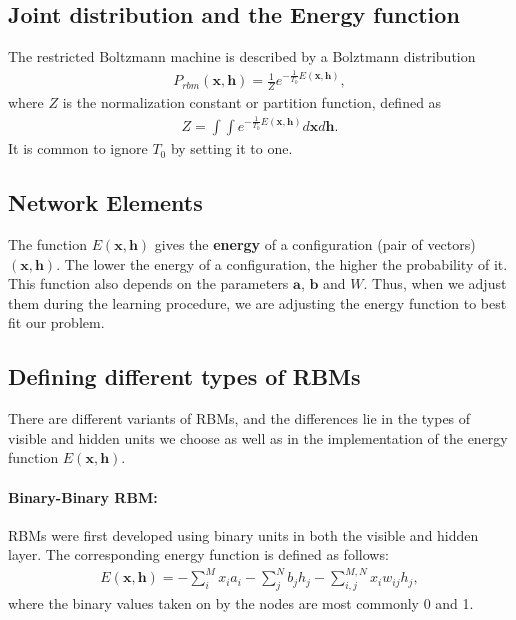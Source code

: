 \documentclass[%
oneside,                 %
final,                   %
10pt]{article}
\begin{document}
\subsection{Joint distribution and the Energy function}
The restricted Boltzmann machine is described by a Bolztmann distribution
\begin{align}
	P_{rbm}(\mathbf{x},\mathbf{h}) = \frac{1}{Z} e^{-\frac{1}{T_0}E(\mathbf{x},\mathbf{h})},
\end{align}
where $Z$ is the normalization constant or partition function, defined as 
\begin{align}
	Z = \int \int e^{-\frac{1}{T_0}E(\mathbf{x},\mathbf{h})} d\mathbf{x} d\mathbf{h}.
\end{align}
It is common to ignore $T_0$ by setting it to one. 

\subsection{Network Elements}

The function $E(\mathbf{x},\mathbf{h})$ gives the \textbf{energy} of a
configuration (pair of vectors) $(\mathbf{x}, \mathbf{h})$. The lower
the energy of a configuration, the higher the probability of it. This
function also depends on the parameters $\mathbf{a}$, $\mathbf{b}$ and
$W$. Thus, when we adjust them during the learning procedure, we are
adjusting the energy function to best fit our problem.

\subsection{Defining different types of RBMs}
There are different variants of RBMs, and the differences lie in the types of visible and hidden units we choose as well as in the implementation of the energy function $E(\mathbf{x},\mathbf{h})$. 


\paragraph{Binary-Binary RBM:}

RBMs were first developed using binary units in both the visible and hidden layer. The corresponding energy function is defined as follows:
\begin{align}
	E(\mathbf{x}, \mathbf{h}) = - \sum_i^M x_i a_i- \sum_j^N b_j h_j - \sum_{i,j}^{M,N} x_i w_{ij} h_j,
\end{align}
where the binary values taken on by the nodes are most commonly 0 and 1.
\end{document}

